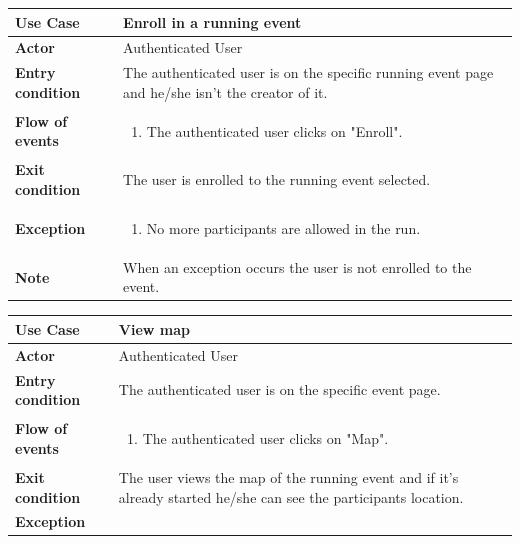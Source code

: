 \documentclass[../main.tex]{subfiles}
\begin{document}
	\begin{center}
		\begin{tabular}{p{3cm}p{8.28cm}}
			\hline
			\textbf{Use Case} & Enroll in a running event\\
			\hline
			\textbf{Actor} & Authenticated User\\
			\hline
			\textbf{Entry condition} & The authenticated user is on the specific running event page and he/she isn't the creator of it.\\
			\hline
			\textbf{Flow of events} & \begin{enumerate}
				\linespread{0}\item The authenticated user clicks on "Enroll".
			\end{enumerate}\\
			\hline
			\textbf{Exit condition} & The user is enrolled to the running event selected.\\
			\hline
			\textbf{Exception} & \begin{enumerate}
				\linespread{0}\item No more participants are allowed in the run.
			\end{enumerate}\\
			\hline
			\textbf{Note} & When an exception occurs the user is not enrolled to the event.\\
			\hline
		\end{tabular}
	\end{center}
	\vspace*{3cm}
	\begin{center}
		\begin{tabular}{p{3cm}p{8.28cm}}
			\hline
			\textbf{Use Case} & View map\\
			\hline
			\textbf{Actor} & Authenticated User\\
			\hline
			\textbf{Entry condition} & The authenticated user is on the specific event page.\\
			\hline
			\textbf{Flow of events} & \begin{enumerate}
				\linespread{0}\item The authenticated user clicks on "Map".
			\end{enumerate}\\
			\hline
			\textbf{Exit condition} & The user views the map of the running event and if it's already started he/she can see the participants location.\\
			\hline
			\textbf{Exception}\\
			\hline
		\end{tabular}
	\end{center}
\end{document}
